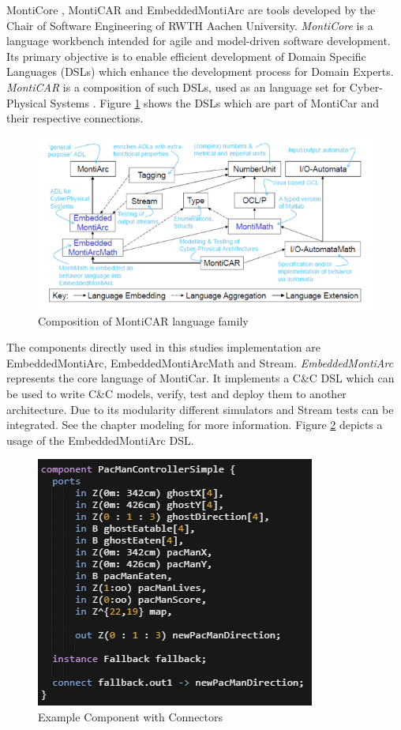 MontiCore \cite{HR17}, MontiCAR \cite{KRRW17} and EmbeddedMontiArc \cite{HKK+18} are tools developed by the Chair of Software Engineering of RWTH Aachen University\cite{serwth}.
\emph{MontiCore} is a language workbench intended for agile and model-driven software development. Its primary objective is to enable efficient development of Domain Specific Languages (DSLs) which enhance the development process for Domain Experts. 
\emph{MontiCAR} is a composition of such DSLs, used as an language set for Cyber-Physical Systems \cite{seminarArmin}. Figure \ref{fig:MontiCAR} shows the DSLs which are part of MontiCar and their respective connections.
\begin{figure}
	\centering
	\includegraphics[scale=0.55]{pictures/MontiCarOverview.PNG}
	\caption{Composition of MontiCAR language family\cite{seminarArmin}}
	\label{fig:MontiCAR}
\end{figure}
The components directly used in this studies implementation are EmbeddedMontiArc, EmbeddedMontiArcMath and Stream.
\emph{EmbeddedMontiArc} represents the core language of MontiCar. It implements a C\&C DSL which can be used to write C\&C models, verify, test and deploy them to another architecture. Due to its modularity different simulators and Stream tests can be integrated. See the chapter modeling for more information. Figure \ref{fig:EMontiArc} depicts a usage of the EmbeddedMontiArc DSL.

\begin{figure}[!h]
	\centering
	\includegraphics[scale=0.70]{pictures/EMA.PNG}
	\caption{Example Component with Connectors}
	\label{fig:EMontiArc}
\end{figure}

